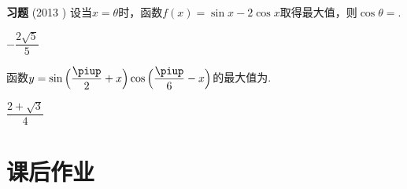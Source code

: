 \begin{exercise}{\textbf{习题}}
      (2013 )
      设当$x=\theta$时，函数$f(x)=\sin x-2\cos x$取得最大值，则$\cos\theta=$\tk.
      \begin{answer}
        $-\dfrac{2\sqrt{5}}5$
      \end{answer}
    \item%
      函数$y=\sin{\Bigl(\dfrac{\piup}2+x\Bigr)\cos{\Bigl(\dfrac{\piup}6-x\Bigr)}}$的最大值为\tk.
      \begin{answer}
        $\dfrac{2+\sqrt{3}}4$
      \end{answer}
  \end{exercise}
\newpage

\section{课后作业}
